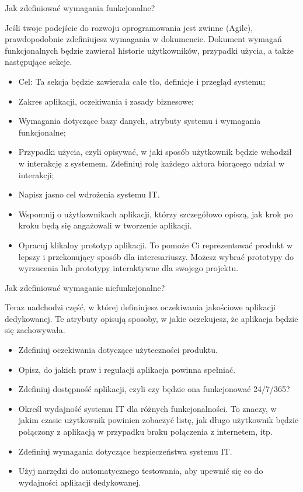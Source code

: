 Jak zdefiniować wymagania funkcjonalne?

Jeśli twoje podejście do rozwoju oprogramowania jest zwinne (Agile), prawdopodobnie zdefiniujesz wymagania w dokumencie. Dokument wymagań funkcjonalnych będzie zawierał historie użytkowników, przypadki użycia, a także następujące sekcje.
\begin{itemize}
    \item Cel: Ta sekcja będzie zawierała całe tło, definicje i przegląd systemu;
    \item Zakres aplikacji, oczekiwania i zasady biznesowe;
    \item Wymagania dotyczące bazy danych, atrybuty systemu i wymagania funkcjonalne;
    \item Przypadki użycia, czyli opisywać, w jaki sposób użytkownik będzie wchodził w interakcję z systemem. Zdefiniuj rolę każdego aktora biorącego udział w interakcji;
    \item Napisz jasno cel wdrożenia systemu IT.
    \item Wspomnij o użytkownikach aplikacji, którzy szczegółowo opiszą, jak krok po kroku będą się angażowali w tworzenie aplikacji.
    \item Opracuj klikalny prototyp aplikacji. To pomoże Ci reprezentować produkt w lepszy i przekonujący sposób dla interesariuszy. Możesz wybrać prototypy do wyrzucenia lub prototypy interaktywne dla swojego projektu.
\end{itemize}

\noindent Jak zdefiniować wymaganie niefunkcjonalne?

Teraz nadchodzi część, w której definiujesz oczekiwania jakościowe aplikacji dedykowanej. Te atrybuty opisują sposoby, w jakie oczekujesz, że aplikacja będzie się zachowywała.
\begin{itemize}
    \item Zdefiniuj oczekiwania dotyczące użyteczności produktu.
    \item Opisz, do jakich praw i regulacji aplikacja powinna spełniać.
    \item Zdefiniuj dostępność aplikacji, czyli czy będzie ona funkcjonować 24/7/365?
    \item Określ wydajność systemu IT dla różnych funkcjonalności. To znaczy, w jakim czasie użytkownik powinien zobaczyć listę, jak długo użytkownik będzie połączony z aplikacją w przypadku braku połączenia z internetem, itp.
    \item Zdefiniuj wymagania dotyczące bezpieczeństwa systemu IT.
    \item Użyj narzędzi do automatycznego testowania, aby upewnić się co do wydajności aplikacji dedykowanej.
\end{itemize}


